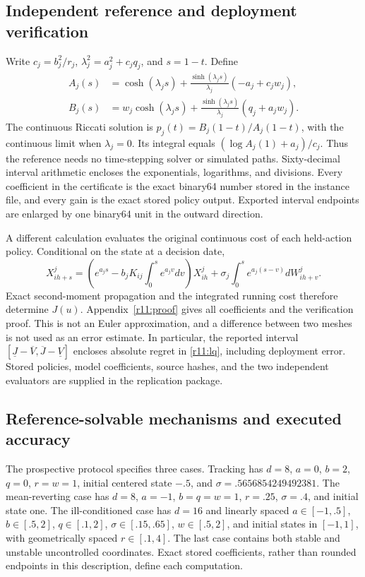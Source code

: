 \subsection{Independent reference and deployment verification}
Write $c_j=b_j^2/r_j$, $\lambda_j^2=a_j^2+c_jq_j$, and $s=1-t$. Define
\begin{align*}
 A_j(s)&=\cosh(\lambda_js)+\frac{\sinh(\lambda_js)}{\lambda_j}(-a_j+c_jw_j),\\
 B_j(s)&=w_j\cosh(\lambda_js)+\frac{\sinh(\lambda_js)}{\lambda_j}(q_j+a_jw_j).
\end{align*}
The continuous Riccati solution is $p_j(t)=B_j(1-t)/A_j(1-t)$, with the continuous limit when $\lambda_j=0$. Its integral equals $(\log A_j(1)+a_j)/c_j$. Thus the reference needs no time-stepping solver or simulated paths. Sixty-decimal interval arithmetic encloses the exponentials, logarithms, and divisions. Every coefficient in the certificate is the exact binary64 number stored in the instance file, and every gain is the exact stored policy output. Exported interval endpoints are enlarged by one binary64 unit in the outward direction.

A different calculation evaluates the original continuous cost of each held-action policy. Conditional on the state at a decision date,
\[
 X^j_{ih+s}=\left(e^{a_js}-b_jK_{ij}\int_0^s e^{a_jv}dv\right)X^j_{ih}
       +\sigma_j\int_0^s e^{a_j(s-v)}dW^j_{ih+v}.
\]
Exact second-moment propagation and the integrated running cost therefore determine $J(u)$. Appendix~\ref{r11:proof} gives all coefficients and the verification proof. This is not an Euler approximation, and a difference between two meshes is not used as an error estimate. In particular, the reported interval $[\underline J-\overline V,\overline J-\underline V]$ encloses absolute regret in \eqref{r11:lq}, including deployment error. Stored policies, model coefficients, source hashes, and the two independent evaluators are supplied in the replication package.

\subsection{Reference-solvable mechanisms and executed accuracy}
The prospective protocol specifies three cases. Tracking has $d=8$, $a=0$, $b=2$, $q=0$, $r=w=1$, initial centered state $-.5$, and $\sigma=.5656854249492381$. The mean-reverting case has $d=8$, $a=-1$, $b=q=w=1$, $r=.25$, $\sigma=.4$, and initial state one. The ill-conditioned case has $d=16$ and linearly spaced $a\in[-1,.5]$, $b\in[.5,2]$, $q\in[.1,2]$, $\sigma\in[.15,.65]$, $w\in[.5,2]$, and initial states in $[-1,1]$, with geometrically spaced $r\in[.1,4]$. The last case contains both stable and unstable uncontrolled coordinates. Exact stored coefficients, rather than rounded endpoints in this description, define each computation.

